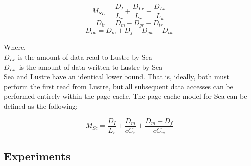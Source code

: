 \documentclass[10pt,journal,compsoc]{IEEEtran}
\begin{document}
      \begin{equation}\label{eq:sea-comp:msl}
          M_{SL} = \frac{D_{I}}{L_{r}} + \frac{D_{Lr}}{L_{r}} + \frac{D_{Lw}}{L_{w}}
      \end{equation}
      \begin{equation*}\label{eq:sea-comp:dlr}
          D_{lr} = D_{m} - D_{gr} - D_{tr}
      \end{equation*}
      \begin{equation*}\label{eq:sea-comp:dlw}
          D_{lw} = D_{m} + D_{f} - D_{gw} - D_{tw}
      \end{equation*}

      Where, \\
      $D_{Lr}$ is the amount of data read to Lustre by Sea \\
      $D_{Lw}$ is the amount of data written to Lustre by Sea \\


      Sea and Lustre have an identical lower bound. That is, ideally, both must
      perform the first read from Lustre, but all subsequent data accesses can
      be performed entirely within the page cache. The page cache model for Sea
      can be defined as the following:

      \begin{equation}\label{eq:sea-comp:msc}
          M_{Sc} = \frac{D_{I}}{L_{r}} + \frac{D_{m}}{cC_{r}} + \frac{D_{m} + D_{f}}{cC_{w}}
      \end{equation}
\subsection{Experiments}
\end{document}
